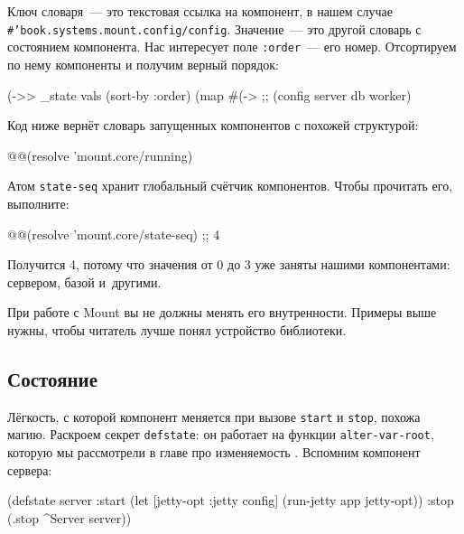 \mnoindent
Ключ словаря~--- это текстовая ссылка на компонент, в нашем случае
\texttt{\#'book.systems.mount\-.config/config}. Значение~--- это другой словарь с
состоянием компонента. Нас интересует поле \verb|:order|~--- его
номер. Отсортируем по нему компоненты и получим верный порядок:

\begin{english}
  \begin{clojure}
(->> _state
     vals
     (sort-by :order)
     (map #(-> %
;; (config server db worker)
  \end{clojure}
\end{english}

Код ниже вернёт словарь запущенных компонентов с похожей структурой:

\begin{english}
  \begin{clojure}
@@(resolve 'mount.core/running)
  \end{clojure}
\end{english}

Атом \verb|state-seq| хранит глобальный счётчик компонентов. Чтобы прочитать
его, выполните:

\begin{english}
  \begin{clojure}
@@(resolve 'mount.core/state-seq) ;; 4
  \end{clojure}
\end{english}

\noindent
Получится 4, потому что значения от 0 до 3 уже заняты нашими компонентами:
сервером, базой и~другими.

При работе с Mount вы не должны менять его внутренности. Примеры выше нужны,
чтобы читатель лучше понял устройство библиотеки.

\subsection{Состояние}


Лёгкость, с которой компонент меняется при вызове \verb|start| и
\verb|stop|, похожа магию. Раскроем секрет \verb|defstate|: он работает на
функции \verb|alter-var-root|, которую мы рассмотрели в главе про
изменяемость . Вспомним компонент сервера:

\begin{english}
  \begin{clojure}
(defstate server
  :start (let [{jetty-opt :jetty} config]
           (run-jetty app jetty-opt))
  :stop (.stop ^Server server))
  \end{clojure}
\end{english}

